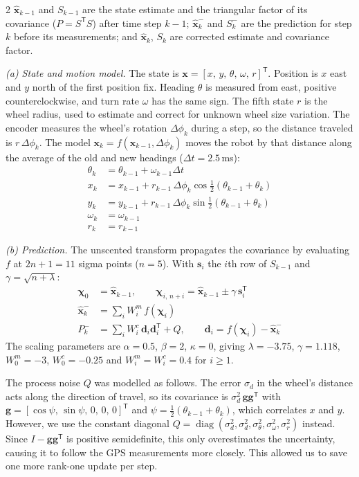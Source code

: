 \documentclass[10pt,letterpaper]{article}
\begin{document}
\begin{multicols}{2}
  $\hat{\mathbf x}_{k-1}$ and $S_{k-1}$ are the state estimate and the triangular factor of its covariance ($P=S^{\mathsf T}S$) after time step $k-1$; $\hat{\mathbf x}_k^-$ and $S_k^-$ are the prediction for step $k$ before its measurements; and $\hat{\mathbf x}_k$, $S_k$ are corrected estimate and covariance factor.

  \textit{(a) State and motion model.}
  The state is $\mathbf{x}=[x,\,y,\,\theta,\,\omega,\,r]^{\mathsf T}$.
  Position is $x$ east and $y$ north of the first position fix.
  Heading $\theta$ is measured from east, positive counterclockwise, and turn rate $\omega$ has the same sign.
  The fifth state $r$ is the wheel radius, used to estimate and correct for unknown wheel size variation.
  The encoder measures the wheel's rotation $\Delta\phi_k$ during a step, so the distance traveled is $r\,\Delta\phi_k$.
  The model $\mathbf{x}_k=f(\mathbf{x}_{k-1},\Delta\phi_k)$ moves the robot by that distance along the average of the old and new headings ($\Delta t=2.5$\,ms):
  \begin{align*}
    \theta_k &= \theta_{k-1}+\omega_{k-1}\Delta t\\
    x_k &= x_{k-1}+r_{k-1}\,\Delta\phi_k\cos\tfrac12(\theta_{k-1}+\theta_k)\\
    y_k &= y_{k-1}+r_{k-1}\,\Delta\phi_k\sin\tfrac12(\theta_{k-1}+\theta_k)\\
    \omega_k &= \omega_{k-1}\\
    r_k &= r_{k-1}
  \end{align*}

  \textit{(b) Prediction.}
  The unscented transform propagates the covariance by evaluating $f$ at $2n+1=11$ sigma points ($n=5$).
  With $\mathbf{s}_i$ the $i$th row of $S_{k-1}$ and $\gamma=\sqrt{n+\lambda}$:
  \begin{align*}
    \boldsymbol\chi_0 &= \hat{\mathbf x}_{k-1},\qquad
    \boldsymbol\chi_{i,\,n+i} = \hat{\mathbf x}_{k-1}\pm\gamma\,\mathbf{s}_i^{\mathsf T}\\
    \hat{\mathbf x}_k^- &= \textstyle\sum_i W_i^m\,f(\boldsymbol\chi_i)\\
    P_k^- &= \textstyle\sum_i W_i^c\,\mathbf{d}_i\mathbf{d}_i^{\mathsf T}+Q,\qquad
    \mathbf{d}_i=f(\boldsymbol\chi_i)-\hat{\mathbf x}_k^-
  \end{align*}
  The scaling parameters are $\alpha=0.5$, $\beta=2$, $\kappa=0$, giving $\lambda=-3.75$, $\gamma=1.118$, $W_0^m=-3$, $W_0^c=-0.25$ and $W_i^m=W_i^c=0.4$ for $i\ge1$.

  The process noise $Q$ was modelled as follows.
  The error $\sigma_d$ in the wheel's distance acts along the direction of travel, so its covariance is $\sigma_d^2\,\mathbf{g}\mathbf{g}^{\mathsf T}$ with $\mathbf{g}=[\cos\psi,\,\sin\psi,\,0,\,0,\,0]^{\mathsf T}$ and $\psi=\tfrac12(\theta_{k-1}+\theta_k)$, which correlates $x$ and $y$.
  However, we use the constant diagonal $Q=\operatorname{diag}(\sigma_d^2,\sigma_d^2,\sigma_\theta^2,\sigma_\omega^2,\sigma_r^2)$ instead.
  Since $I-\mathbf{g}\mathbf{g}^{\mathsf T}$ is positive semidefinite, this only overestimates the uncertainty, causing it to follow the GPS measurements more closely. This allowed us to save one more rank-one update per step.


\end{multicols}
\end{document}
